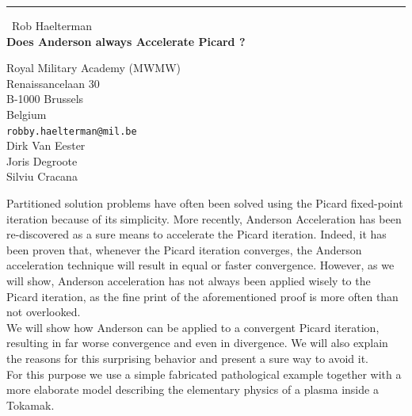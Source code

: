 \documentclass{report}
\begin{document}
\begin{center}
\rule{6in}{1pt} \
{\large Rob Haelterman \\
{\bf Does Anderson always Accelerate Picard ?}}

Royal Military Academy (MWMW) \\ Renaissancelaan 30 \\ B-1000 Brussels \\ Belgium
\\
{\tt robby.haelterman@mil.be}\\
Dirk Van Eester\\
Joris Degroote\\
Silviu Cracana\end{center}

Partitioned solution problems have often been solved using the Picard
fixed-point iteration because of its simplicity. More recently, Anderson
Acceleration has been re-discovered as a sure means to accelerate the
Picard iteration. Indeed, it has been proven that, whenever the Picard
iteration converges, the Anderson acceleration technique will result in
equal or faster convergence. However, as we will show, Anderson
acceleration has not always been applied wisely to the Picard iteration,
as the fine print of the aforementioned proof is more often than not
overlooked.\\
We will show how Anderson can be applied to a convergent Picard
iteration, resulting in far worse convergence and even in divergence. We
will also explain the reasons for this surprising behavior and present a
sure way to avoid it.\\
For this purpose we use a simple fabricated pathological example together
with a more elaborate model describing the elementary physics of a plasma
inside a Tokamak.
\end{document}
